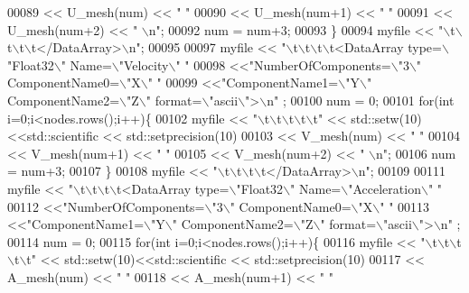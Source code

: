 \begin{DoxyCode}
00089         << U\_mesh(num) << \textcolor{stringliteral}{" "}
00090         << U\_mesh(num+1) << \textcolor{stringliteral}{" "}
00091         << U\_mesh(num+2) << \textcolor{stringliteral}{" \(\backslash\)n"};
00092             num = num+3;
00093     \}
00094     myfile << \textcolor{stringliteral}{"\(\backslash\)t\(\backslash\)t\(\backslash\)t\(\backslash\)t</DataArray>\(\backslash\)n"};
00095 
00097     myfile << \textcolor{stringliteral}{"\(\backslash\)t\(\backslash\)t\(\backslash\)t\(\backslash\)t<DataArray type=\(\backslash\)"Float32\(\backslash\)" Name=\(\backslash\)"Velocity\(\backslash\)" "}
00098         <<\textcolor{stringliteral}{"NumberOfComponents=\(\backslash\)"3\(\backslash\)" ComponentName0=\(\backslash\)"X\(\backslash\)" "}
00099         <<\textcolor{stringliteral}{"ComponentName1=\(\backslash\)"Y\(\backslash\)" ComponentName2=\(\backslash\)"Z\(\backslash\)" format=\(\backslash\)"ascii\(\backslash\)">\(\backslash\)n"} ;
00100     num = 0;
00101     \textcolor{keywordflow}{for}(\textcolor{keywordtype}{int} i=0;i<nodes.rows();i++)\{
00102         myfile << \textcolor{stringliteral}{"\(\backslash\)t\(\backslash\)t\(\backslash\)t\(\backslash\)t\(\backslash\)t"} << std::setw(10)<<std::scientific << std::setprecision(10)
00103         << V\_mesh(num) << \textcolor{stringliteral}{" "}
00104         << V\_mesh(num+1) << \textcolor{stringliteral}{" "}
00105         << V\_mesh(num+2) << \textcolor{stringliteral}{" \(\backslash\)n"};
00106             num = num+3;
00107     \}
00108     myfile << \textcolor{stringliteral}{"\(\backslash\)t\(\backslash\)t\(\backslash\)t\(\backslash\)t</DataArray>\(\backslash\)n"};
00109 
00111     myfile << \textcolor{stringliteral}{"\(\backslash\)t\(\backslash\)t\(\backslash\)t\(\backslash\)t<DataArray type=\(\backslash\)"Float32\(\backslash\)" Name=\(\backslash\)"Acceleration\(\backslash\)" "}
00112         <<\textcolor{stringliteral}{"NumberOfComponents=\(\backslash\)"3\(\backslash\)" ComponentName0=\(\backslash\)"X\(\backslash\)" "}
00113         <<\textcolor{stringliteral}{"ComponentName1=\(\backslash\)"Y\(\backslash\)" ComponentName2=\(\backslash\)"Z\(\backslash\)" format=\(\backslash\)"ascii\(\backslash\)">\(\backslash\)n"} ;
00114     num = 0;
00115     \textcolor{keywordflow}{for}(\textcolor{keywordtype}{int} i=0;i<nodes.rows();i++)\{
00116         myfile << \textcolor{stringliteral}{"\(\backslash\)t\(\backslash\)t\(\backslash\)t\(\backslash\)t\(\backslash\)t"} << std::setw(10)<<std::scientific << std::setprecision(10)
00117         << A\_mesh(num) << \textcolor{stringliteral}{" "}
00118         << A\_mesh(num+1) << \textcolor{stringliteral}{" "}

\end{DoxyCode}
